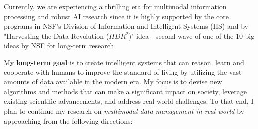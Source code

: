 Currently, we are experiencing a thrilling era for multimodal information processing and robust AI research since it is highly supported by the core programs in NSF's Division of Information and Intelligent Systems (IIS) and by "Harvesting the Data Revolution ($HDR^2$)" idea - second wave of one of the 10 big ideas
by NSF for long-term research.


My \textbf{long-term goal} is to create intelligent systems that can reason, learn and cooperate with humans to improve the standard of living by utilizing the vast amounts of data available in the modern era. My focus is to devise new algorithms and methods that can make a significant impact on society, leverage existing scientific advancements, and address real-world challenges. To that end, I
plan to continue my research on \textit{multimodal data management in real world} by approaching from the following directions:


